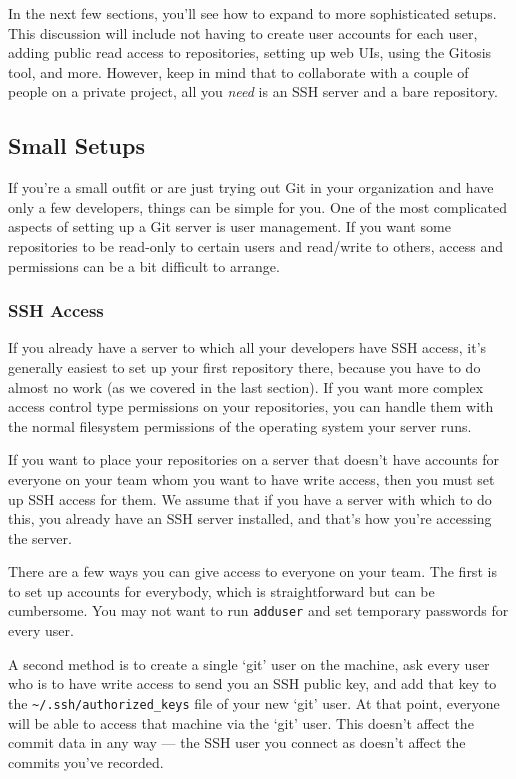 \documentclass[a4paper]{book}
\begin{document}
In the next few sections, you'll see how to expand to more sophisticated setups. This discussion will include not having to create user accounts for each user, adding public read access to repositories, setting up web UIs, using the Gitosis tool, and more. However, keep in mind that to collaborate with a couple of people on a private project, all you \emph{need} is an SSH server and a bare repository.

\subsection{Small Setups}\label{small-setups}

If you're a small outfit or are just trying out Git in your organization and have only a few developers, things can be simple for you. One of the most complicated aspects of setting up a Git server is user management. If you want some repositories to be read-only to certain users and read/write to others, access and permissions can be a bit difficult to arrange.

\subsubsection{SSH Access}

If you already have a server to which all your developers have SSH access, it's generally easiest to set up your first repository there, because you have to do almost no work (as we covered in the last section). If you want more complex access control type permissions on your repositories, you can handle them with the normal filesystem permissions of the operating system your server runs.

If you want to place your repositories on a server that doesn't have accounts for everyone on your team whom you want to have write access, then you must set up SSH access for them. We assume that if you have a server with which to do this, you already have an SSH server installed, and that's how you're accessing the server.

There are a few ways you can give access to everyone on your team. The first is to set up accounts for everybody, which is straightforward but can be cumbersome. You may not want to run \texttt{adduser} and set temporary passwords for every user.

A second method is to create a single `git' user on the machine, ask every user who is to have write access to send you an SSH public key, and add that key to the \texttt{\textasciitilde{}/.ssh/authorized\_keys} file of your new `git' user. At that point, everyone will be able to access that machine via the `git' user. This doesn't affect the commit data in any way --- the SSH user you connect as doesn't affect the commits you've recorded.
\end{document}
